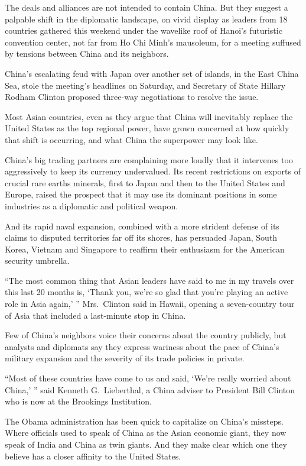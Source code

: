 ﻿\documentclass[12pt]{article}
\begin{document}
The deals and alliances are not intended to contain China. But they suggest a palpable shift in the
diplomatic landscape, on vivid display as leaders from 18 countries gathered this weekend under the
wavelike roof of Hanoi's futuristic convention center, not far from Ho Chi Minh's mausoleum, for a
meeting suffused by tensions between China and its neighbors.

China's escalating feud with Japan over another set of islands, in the East China Sea, stole the
meeting's headlines on Saturday, and Secretary of State Hillary Rodham Clinton proposed three-way
negotiations to resolve the issue.

Most Asian countries, even as they argue that China will inevitably replace the United States as the
top regional power, have grown concerned at how quickly that shift is occurring, and what China the
superpower may look like.

China's big trading partners are complaining more loudly that it intervenes too aggressively to keep
its currency undervalued. Its recent restrictions on exports of crucial rare earths minerals, first
to Japan and then to the United States and Europe, raised the prospect that it may use its dominant
positions in some industries as a diplomatic and political weapon.

And its rapid naval expansion, combined with a more strident defense of its claims to disputed
territories far off its shores, has persuaded Japan, South Korea, Vietnam and Singapore to reaffirm
their enthusiasm for the American security umbrella.

``The most common thing that Asian leaders have said to me in my travels over this last 20 months
is, `Thank you, we're so glad that you're playing an active role in Asia again,' '' Mrs.~Clinton
said in Hawaii, opening a seven-country tour of Asia that included a last-minute stop in China.

Few of China's neighbors voice their concerns about the country publicly, but analysts and diplomats
say they express wariness about the pace of China's military expansion and the severity of its trade
policies in private.

``Most of these countries have come to us and said, `We're really worried about China,' '' said
Kenneth G.~Lieberthal, a China adviser to President Bill Clinton who is now at the Brookings
Institution.

The Obama administration has been quick to capitalize on China's missteps. Where officials used to
speak of China as the Asian economic giant, they now speak of India and China as twin giants. And
they make clear which one they believe has a closer affinity to the United States.
\end{document}
